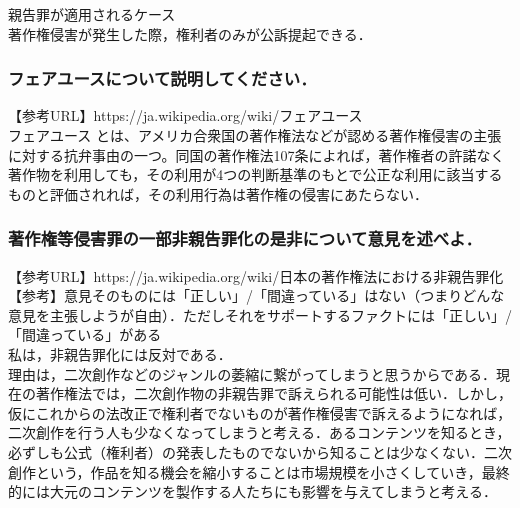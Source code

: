 親告罪が適用されるケース\\
著作権侵害が発生した際，権利者のみが公訴提起できる．

\subsubsection{フェアユースについて説明してください．}
【参考URL】https://ja.wikipedia.org/wiki/フェアユース\\
フェアユース とは、アメリカ合衆国の著作権法などが認める著作権侵害の主張に対する抗弁事由の一つ。同国の著作権法107条によれば，著作権者の許諾なく著作物を利用しても，その利用が4つの判断基準のもとで公正な利用に該当するものと評価されれば，その利用行為は著作権の侵害にあたらない．

\subsubsection{著作権等侵害罪の一部非親告罪化の是非について意見を述べよ．}
【参考URL】https://ja.wikipedia.org/wiki/日本の著作権法における非親告罪化\\
【参考】意見そのものには「正しい」/「間違っている」はない（つまりどんな意見を主張しようが自由）．ただしそれをサポートするファクトには「正しい」/「間違っている」がある\\

私は，非親告罪化には反対である．\\
理由は，二次創作などのジャンルの萎縮に繋がってしまうと思うからである．現在の著作権法では，二次創作物の非親告罪で訴えられる可能性は低い．しかし，仮にこれからの法改正で権利者でないものが著作権侵害で訴えるようになれば，二次創作を行う人も少なくなってしまうと考える．あるコンテンツを知るとき，必ずしも公式（権利者）の発表したものでないから知ることは少なくない．二次創作という，作品を知る機会を縮小することは市場規模を小さくしていき，最終的には大元のコンテンツを製作する人たちにも影響を与えてしまうと考える．



